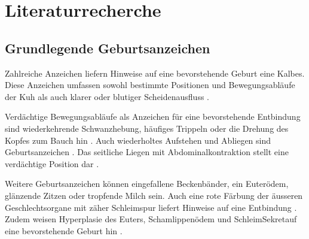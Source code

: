 \section{Literaturrecherche}
\subsection{Grundlegende Geburtsanzeichen}

Zahlreiche Anzeichen liefern Hinweise auf eine bevorstehende Geburt eine Kalbes. Diese Anzeichen umfassen sowohl bestimmte Positionen und Bewegungsabläufe der Kuh als auch klarer oder blutiger Scheidenausfluss \citep[S. 1]{Lange2017}.

Verdächtige Bewegungsabläufe als Anzeichen für eine bevorstehende Entbindung sind wiederkehrende Schwanzhebung, häufiges Trippeln oder die Drehung des Kopfes zum Bauch hin \citep[S. 1]{Lange2017}. Auch wiederholtes Aufstehen und Abliegen sind Geburtsanzeichen \citep[S. 4]{Saint-Dizier2015}. Das seitliche Liegen mit Abdominalkontraktion stellt eine verdächtige Position dar \citep[S. 1]{Lange2017}. 

Weitere Geburtsanzeichen können eingefallene Beckenbänder, ein Euterödem, glänzende Zitzen oder tropfende Milch sein. Auch eine rote Färbung der  äusseren Geschlechtsorgane mit zäher Schleimspur liefert Hinweise auf eine Entbindung \citep[S. 6]{Traulsen2013}. Zudem weisen \gls{Hyperplasie} des Euters, Schamlippenödem und Schleim\gls{Sekret}auf eine bevorstehende Geburt hin \citep[S. 2]{Streyl2011}.


